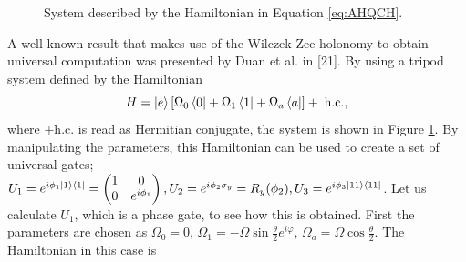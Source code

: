 \begin{figure}[H]
\begin{center}
    \caption{System described by the Hamiltonian in Equation \ref{eq:AHQCH}.} 
     \label{fig:HamAH}
    \end{center}

\end{figure}
A well known result that makes use of the Wilczek-Zee holonomy to obtain universal computation was presented by Duan et al. in [21]. By using a tripod system defined by the Hamiltonian
\begin{equation}
\label{eq:AHQCH}
H = \ket{e}[\Omega_0\bra{0} + \Omega_1\bra{1} + \Omega_a\bra{a}] + \;\text{h.c}.,
\end{equation}
where +\;h.c. is read as Hermitian conjugate, the system is shown in Figure \ref{fig:HamAH}. By manipulating the parameters, this Hamiltonian can be used to create a set of universal gates; $U_1 = e^{i\phi_1\ket{1}\bra{1}} = \begin{pmatrix}
1 & 0\\
0 & e^{i\phi_1}
\end{pmatrix}, U_2 =  e^{i\phi_2\sigma_y} = R_y(\phi_2), U_3 =  e^{i\phi_3\ket{11}\bra{11}}$.
Let us calculate $U_1$, which is a phase gate, to see how this is obtained. First the parameters are chosen as $\Omega_0 = 0,\,\Omega_1 = -\Omega\sin\frac{\theta}{2}e^{i\varphi},\, \Omega_a = \Omega\cos\frac{\theta}{2}$. The Hamiltonian in this case is 
